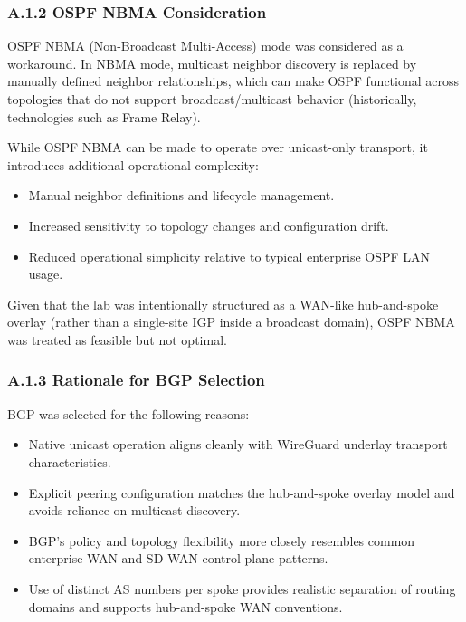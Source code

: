 \documentclass[11pt]{article}
\begin{document}
\subsubsection{A.1.2 OSPF NBMA Consideration}
\label{subsubsec:a1-ospf-nbma}

OSPF NBMA (Non-Broadcast Multi-Access) mode was considered as a workaround. In NBMA mode, multicast neighbor discovery is replaced by manually defined neighbor relationships, which can make OSPF functional across topologies that do not support broadcast/multicast behavior (historically, technologies such as Frame Relay).

While OSPF NBMA can be made to operate over unicast-only transport, it introduces additional operational complexity:
\begin{itemize}
  \item Manual neighbor definitions and lifecycle management.
  \item Increased sensitivity to topology changes and configuration drift.
  \item Reduced operational simplicity relative to typical enterprise OSPF LAN usage.
\end{itemize}

Given that the lab was intentionally structured as a WAN-like hub-and-spoke overlay (rather than a single-site IGP inside a broadcast domain), OSPF NBMA was treated as feasible but not optimal.

\subsubsection{A.1.3 Rationale for BGP Selection}
\label{subsubsec:a1-bgp-rationale}

BGP was selected for the following reasons:
\begin{itemize}
  \item Native unicast operation aligns cleanly with WireGuard underlay transport characteristics.
  \item Explicit peering configuration matches the hub-and-spoke overlay model and avoids reliance on multicast discovery.
  \item BGP’s policy and topology flexibility more closely resembles common enterprise WAN and SD-WAN control-plane patterns.
  \item Use of distinct AS numbers per spoke provides realistic separation of routing domains and supports hub-and-spoke WAN conventions.
\end{itemize}
\end{document}
